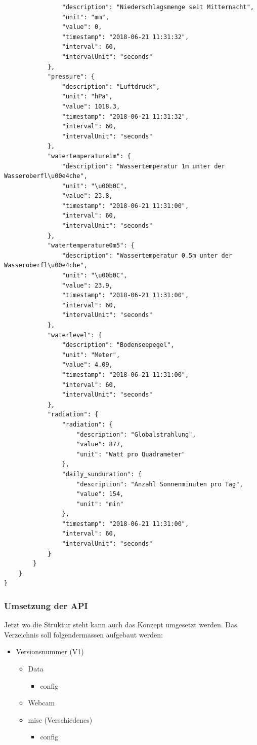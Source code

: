 \begin{lstlisting}
				"description": "Niederschlagsmenge seit Mitternacht",
				"unit": "mm",
				"value": 0,
				"timestamp": "2018-06-21 11:31:32",
				"interval": 60,
				"intervalUnit": "seconds"
			},
			"pressure": {
				"description": "Luftdruck",
				"unit": "hPa",
				"value": 1018.3,
				"timestamp": "2018-06-21 11:31:32",
				"interval": 60,
				"intervalUnit": "seconds"
			},
			"watertemperature1m": {
				"description": "Wassertemperatur 1m unter der Wasseroberfl\u00e4che",
				"unit": "\u00b0C",
				"value": 23.8,
				"timestamp": "2018-06-21 11:31:00",
				"interval": 60,
				"intervalUnit": "seconds"
			},
			"watertemperature0m5": {
				"description": "Wassertemperatur 0.5m unter der Wasseroberfl\u00e4che",
				"unit": "\u00b0C",
				"value": 23.9,
				"timestamp": "2018-06-21 11:31:00",
				"interval": 60,
				"intervalUnit": "seconds"
			},
			"waterlevel": {
				"description": "Bodenseepegel",
				"unit": "Meter",
				"value": 4.09,
				"timestamp": "2018-06-21 11:31:00",
				"interval": 60,
				"intervalUnit": "seconds"
			},
			"radiation": {
				"radiation": {
					"description": "Globalstrahlung",
					"value": 877,
					"unit": "Watt pro Quadrameter"
				},
				"daily_sunduration": {
					"description": "Anzahl Sonnenminuten pro Tag",
					"value": 154,
					"unit": "min"
				},
				"timestamp": "2018-06-21 11:31:00",
				"interval": 60,
				"intervalUnit": "seconds"
			}
		}
	}
}

\end{lstlisting}

\subsubsection{Umsetzung der API}

Jetzt wo die Struktur steht kann auch das Konzept umgesetzt werden. Das Verzeichnis soll folgendermassen aufgebaut werden:

\begin{itemize}
\item Versionsnummer (V1)
\begin{itemize}
\item Data
\begin{itemize}
\item config
\end{itemize}
\item Webcam
\item misc (Verschiedenes)
\begin{itemize}
\item config
\end{itemize}
\end{itemize}
\end{itemize}

